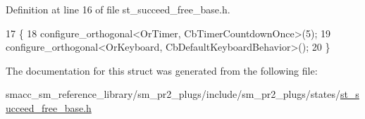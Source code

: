 Definition at line 16 of file st\+\_\+succeed\+\_\+free\+\_\+base.\+h.


\begin{DoxyCode}
17     \{
18         configure\_orthogonal<OrTimer,  CbTimerCountdownOnce>(5);    
19         configure\_orthogonal<OrKeyboard, CbDefaultKeyboardBehavior>();
20     \}
\end{DoxyCode}


The documentation for this struct was generated from the following file\+:\begin{DoxyCompactItemize}
\item 
smacc\+\_\+sm\+\_\+reference\+\_\+library/sm\+\_\+pr2\+\_\+plugs/include/sm\+\_\+pr2\+\_\+plugs/states/\hyperlink{st__succeed__free__base_8h}{st\+\_\+succeed\+\_\+free\+\_\+base.\+h}\end{DoxyCompactItemize}
